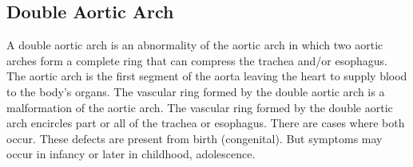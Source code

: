 \documentclass{article}
\begin{document}
\subsection{Double Aortic Arch}
A double aortic arch is an abnormality of the aortic arch in which two aortic arches form a complete ring that can compress the trachea and/or esophagus. The aortic arch is the first segment of the aorta leaving the heart to supply blood to the body's organs. The vascular ring formed by the double aortic arch is a malformation of the aortic arch. The vascular ring formed by the double aortic arch encircles part or all of the trachea or esophagus. There are cases where both occur. These defects are present from birth (congenital). But symptoms may occur in infancy or later in childhood, adolescence.

\newpage


\end{document}
